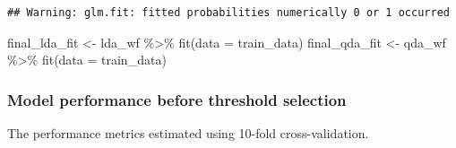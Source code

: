 \documentclass[
]{article}
\newenvironment{Shaded}{\begin{snugshade}}{\end{snugshade}}
\newcommand{\AttributeTok}[1]{\textcolor[rgb]{0.77,0.63,0.00}{#1}}
\newcommand{\FunctionTok}[1]{\textcolor[rgb]{0.00,0.00,0.00}{#1}}
\newcommand{\NormalTok}[1]{#1}
\newcommand{\OtherTok}[1]{\textcolor[rgb]{0.56,0.35,0.01}{#1}}
\newcommand{\SpecialCharTok}[1]{\textcolor[rgb]{0.00,0.00,0.00}{#1}}
\begin{document}
\begin{verbatim}
## Warning: glm.fit: fitted probabilities numerically 0 or 1 occurred
\end{verbatim}

\begin{Shaded}
\begin{Highlighting}[]
\NormalTok{final\_lda\_fit    }\OtherTok{\textless{}{-}}\NormalTok{ lda\_wf }\SpecialCharTok{\%\textgreater{}\%} \FunctionTok{fit}\NormalTok{(}\AttributeTok{data =}\NormalTok{ train\_data)}
\NormalTok{final\_qda\_fit    }\OtherTok{\textless{}{-}}\NormalTok{ qda\_wf }\SpecialCharTok{\%\textgreater{}\%} \FunctionTok{fit}\NormalTok{(}\AttributeTok{data =}\NormalTok{ train\_data)}
\end{Highlighting}
\end{Shaded}

\hypertarget{model-performance-before-threshold-selection}{%
\subsubsection{Model performance before threshold
selection}\label{model-performance-before-threshold-selection}}

The performance metrics estimated using 10-fold cross-validation.
\end{document}
